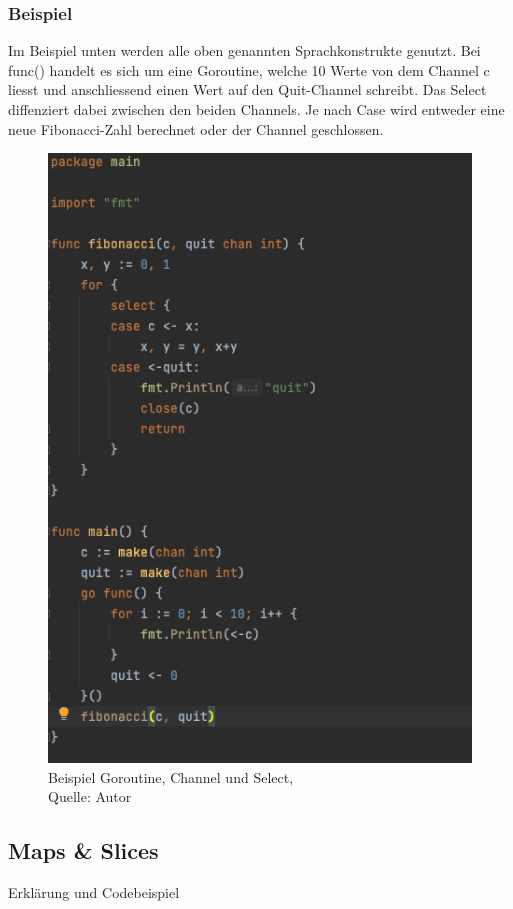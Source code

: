 \documentclass[12pt,titlepage]{article}
\begin{document}
\subsubsection{Beispiel}
Im Beispiel unten werden alle oben genannten Sprachkonstrukte genutzt. Bei func() handelt es sich um eine Goroutine, welche 10 Werte von dem Channel c liesst und anschliessend einen Wert auf den Quit-Channel schreibt. Das Select diffenziert dabei zwischen den beiden Channels. Je nach Case wird entweder eine neue Fibonacci-Zahl berechnet oder der Channel geschlossen. 
\begin{figure}[H]
	\centering
	\includegraphics[scale=0.3]{fibGoroutine.PNG}
	\caption[Beispiel Goroutine, Channel und Select]{Beispiel Goroutine, Channel und Select,\\ Quelle: Autor}
	\label{img: fibGoroutine}
\end{figure} 


\subsection{Maps \& Slices}
Erklärung und Codebeispiel
\end{document}
